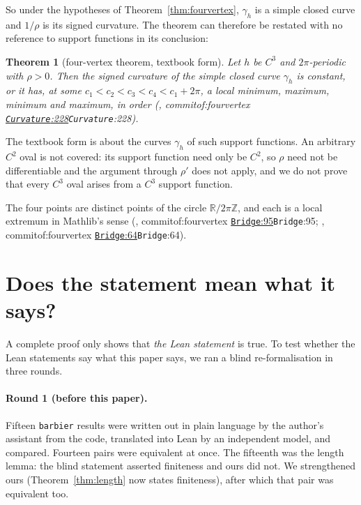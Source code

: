 \documentclass[11pt]{article}
\newtheorem{theorem}{Theorem}
\theoremstyle{definition}
\theoremstyle{remark}
\newcommand{\lean}[1]{\texttt{#1}}
\newcommand{\RR}{\mathbb{R}}
\newcommand{\commitof}[1]{\csname commitof:#1\endcsname}
\newcommand{\repo}[1]{https://github.com/jpbald93/#1}
\newcommand{\src}[4]{\ifcsname commitof:#1\endcsname
  \href{\repo{#1}/blob/\commitof{#1}/#2/#3.lean\#L#4}{\texttt{#3}:#4}\else\texttt{#3}:#4\fi}
\begin{document}
So under the hypotheses of Theorem~\ref{thm:fourvertex}, $\gamma_h$ is a simple closed curve and
$1/\rho$ is its signed curvature. The theorem can therefore be restated with no reference to
support functions in its conclusion:

\begin{theorem}[four-vertex theorem, textbook form]\label{thm:fvtextbook}
Let $h$ be $C^3$ and $2\pi$-periodic with $\rho>0$. Then the signed curvature of the simple closed
curve $\gamma_h$ is constant, or it has, at some $c_1<c_2<c_3<c_4<c_1+2\pi$, a local minimum, maximum,
minimum and maximum, in order (, \src{fourvertex}{FourVertex}{Curvature}{228}).
\end{theorem}

The textbook form is about the curves $\gamma_h$ of such support functions. An arbitrary $C^2$ oval
is not covered: its support function need only be $C^2$, so $\rho$ need not be differentiable and
the argument through $\rho'$ does not apply, and we do not prove that every $C^3$ oval arises
from a $C^3$ support function.

The four points are distinct points of the circle $\RR/2\pi\mathbb{Z}$, and each is a local extremum
in Mathlib's sense (, \src{fourvertex}{FourVertex}{Bridge}{95};
, \src{fourvertex}{FourVertex}{Bridge}{64}).

\section{Does the statement mean what it says?}\label{sec:blind}

A complete proof only shows that \emph{the Lean statement} is true. To test whether the Lean
statements say what this paper says, we ran a blind re-formalisation in three rounds.

\paragraph{Round 1 (before this paper).} Fifteen \lean{barbier} results were written out in plain
language by the author's assistant from the code, translated into Lean by an independent model, and
compared. Fourteen pairs were equivalent at once. The fifteenth was the length lemma: the blind
statement asserted finiteness and ours did not. We strengthened ours (Theorem~\ref{thm:length} now
states finiteness), after which that pair was equivalent too.
\end{document}
